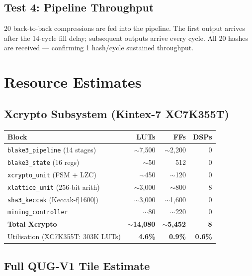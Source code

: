 \documentclass[11pt,a4paper]{article}
\begin{document}
\subsection{Test 4: Pipeline Throughput}

20 back-to-back compressions are fed into the pipeline. The first output
arrives after the 14-cycle fill delay; subsequent outputs arrive every
cycle. All 20 hashes are received --- confirming 1 hash/cycle sustained
throughput.

\section{Resource Estimates}

\subsection{Xcrypto Subsystem (Kintex-7 XC7K355T)}

\begin{center}
\begin{tabular}{lrrr}
\toprule
\textbf{Block} & \textbf{LUTs} & \textbf{FFs} & \textbf{DSPs} \\
\midrule
\texttt{blake3\_pipeline} (14 stages) & $\sim$7{,}500 & $\sim$2{,}200 & 0 \\
\texttt{blake3\_state} (16 regs) & $\sim$50 & 512 & 0 \\
\texttt{xcrypto\_unit} (FSM + LZC) & $\sim$450 & $\sim$120 & 0 \\
\texttt{xlattice\_unit} (256-bit arith) & $\sim$3{,}000 & $\sim$800 & 8 \\
\texttt{sha3\_keccak} (Keccak-f[1600]) & $\sim$3{,}000 & $\sim$1{,}600 & 0 \\
\texttt{mining\_controller} & $\sim$80 & $\sim$220 & 0 \\
\midrule
\textbf{Total Xcrypto} & $\sim$\textbf{14{,}080} & $\sim$\textbf{5{,}452} & \textbf{8} \\
\midrule
Utilisation (XC7K355T: 303K LUTs) & \textbf{4.6\%} & \textbf{0.9\%} & \textbf{0.6\%} \\
\bottomrule
\end{tabular}
\end{center}

\subsection{Full QUG-V1 Tile Estimate}
\end{document}
